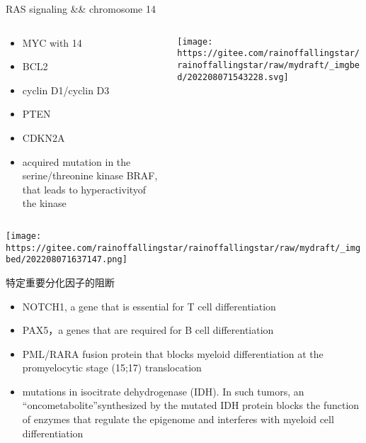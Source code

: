\documentclass[
  ignorenonframetext,
]{beamer}
\begin{document}
\begin{frame}
\begin{block}{RAS signaling \&\& chromosome 14}
\protect\hypertarget{ras-signaling-chromosome-14}{}
\begin{columns}[T]
\begin{column}{0.3\textwidth}
\begin{itemize}
\item
  MYC with 14
\item
  BCL2
\item
  cyclin D1/cyclin D3
\item
  PTEN
\item
  CDKN2A
\item
  acquired mutation in the serine/threonine kinase BRAF, that leads to
  hyperactivityof the kinase
\end{itemize}
\end{column}

\begin{column}{0.7\textwidth}
\texttt{[image: https://gitee.com/rainoffallingstar/rainoffallingstar/raw/mydraft/\_imgbed/202208071543228.svg]}
\end{column}
\end{columns}
\end{block}
\end{frame}

\begin{frame}
\texttt{[image: https://gitee.com/rainoffallingstar/rainoffallingstar/raw/mydraft/\_imgbed/202208071637147.png]}
\end{frame}

\begin{frame}
\begin{block}{特定重要分化因子的阻断}
\protect\hypertarget{ux7279ux5b9aux91cdux8981ux5206ux5316ux56e0ux5b50ux7684ux963bux65ad}{}
\begin{itemize}
\item
  NOTCH1, a gene that is essential for T cell differentiation
\item
  PAX5，a genes that are required for B cell differentiation
\item
  PML/RARA fusion protein that blocks myeloid differentiation at the
  promyelocytic stage (15;17) translocation
\item
  mutations in isocitrate dehydrogenase (IDH). In such tumors, an
  ``oncometabolite''synthesized by the mutated IDH protein blocks the
  function of enzymes that regulate the epigenome and interferes with
  myeloid cell differentiation
\end{itemize}
\end{block}
\end{frame}
\end{document}
